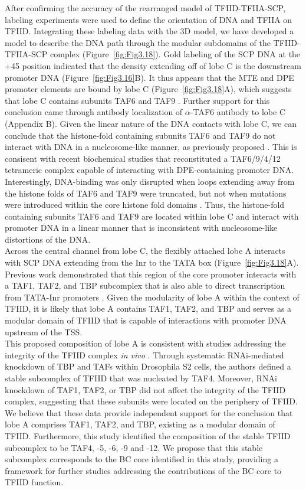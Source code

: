 \indent After confirming the accuracy of the rearranged model of TFIID-TFIIA-SCP, labeling experiments were used to define the orientation of DNA and TFIIA on TFIID. Integrating these labeling data with the 3D model, we have developed a model to describe the DNA path through the modular subdomains of the TFIID-TFIIA-SCP complex (Figure~\ref{fig:Fig3.18}). Gold labeling of the SCP DNA at the +45 position indicated that the density extending off of lobe C is the downstream promoter DNA (Figure~\ref{fig:Fig3.16}B). It thus appears that the MTE and DPE promoter elements are bound by lobe C (Figure~\ref{fig:Fig3.18}A), which suggests that lobe C contains subunits TAF6 and TAF9 \cite{Burke_2739, Theisen_341}. Further support for this conclusion came through antibody localization of $\alpha$-TAF6 antibody to lobe C (Appendix B). Given the linear nature of the DNA contacts with lobe C, we can conclude that the histone-fold containing subunits TAF6 and TAF9 do not interact with DNA in a nucleosome-like manner, as previously proposed \cite{Xie_2805}. This is consisent with recent biochemical studies that reconstituted a TAF6/9/4/12 tetrameric complex capable of interacting with DPE-containing promoter DNA. Interestingly, DNA-binding was only disrupted when loops extending away from the histone folds of TAF6 and TAF9 were truncated, but not when mutations were introduced within the core histone fold domains  \cite{Shao_1340}. Thus, the histone-fold containing subunits TAF6 and TAF9 are located within lobe C and interact with promoter DNA in a linear manner that is inconsistent with nucleosome-like distortions of the DNA. \\ 
\indent Across the central channel from lobe C, the flexibly attached lobe A interacts with SCP DNA extending from the Inr to the TATA box (Figure~\ref{fig:Fig3.18}A). Previous work demonstrated that this region of the core promoter interacts with a TAF1, TAF2, and TBP subcomplex that is also able to direct transcription from TATA-Inr promoters \cite{Chalkley_2339}. Given the modularity of lobe A within the context of TFIID, it is likely that lobe A contains TAF1, TAF2, and TBP and serves as a modular domain of TFIID that is capable of interactions with promoter DNA upstream of the TSS. \\
\indent This proposed composition of lobe A is consistent with studies addressing the integrity of the TFIID complex \emph{in vivo} \cite{Wright_1170}.  Through systematic RNAi-mediated knockdown of TBP and TAFs within Drosophila S2 cells, the authors defined a stable subcomplex of TFIID that was nucleated by TAF4.  Moreover, RNAi knockdown of TAF1, TAF2, or TBP did not affect the integrity of the TFIID complex, suggesting that these subunits were located on the periphery of TFIID.  We believe that these data provide independent support for the conclusion that lobe A comprises TAF1, TAF2, and TBP, existing as a modular domain of TFIID.  Furthermore, this study identified the composition of the stable TFIID subcomplex to be TAF4, -5, -6, -9 and -12.  We propose that this stable subcomplex corresponds to the BC core identified in this study, providing a framework for further studies addressing the contributions of the BC core to TFIID function.  \\
